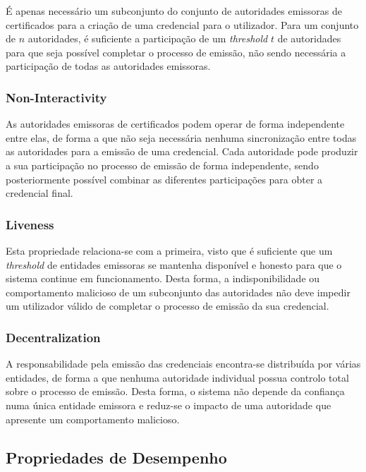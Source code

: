É apenas necessário um subconjunto do conjunto de autoridades emissoras de certificados para a criação de uma credencial para o utilizador. Para um conjunto de $n$ autoridades, é suficiente a participação de um \textit{threshold} $t$ de autoridades para que seja possível completar o processo de emissão, não sendo necessária a participação de todas as autoridades emissoras.

\subsubsection{Non-Interactivity}

As autoridades emissoras de certificados podem operar de forma independente entre elas, de forma a que não seja necessária nenhuma sincronização entre todas as autoridades para a emissão de uma credencial. Cada autoridade pode produzir a sua participação no processo de emissão de forma independente, sendo posteriormente possível combinar as diferentes participações para obter a credencial final.

\subsubsection{Liveness}

Esta propriedade relaciona-se com a primeira, visto que é suficiente que um \textit{threshold} de entidades emissoras se mantenha disponível e honesto para que o sistema continue em funcionamento. Desta forma, a indisponibilidade ou comportamento malicioso de um subconjunto das autoridades não deve impedir um utilizador válido de completar o processo de emissão da sua credencial.

\subsubsection{Decentralization}

A responsabilidade pela emissão das credenciais encontra-se distribuída por várias entidades, de forma a que nenhuma autoridade individual possua controlo total sobre o processo de emissão. Desta forma, o sistema não depende da confiança numa única entidade emissora e reduz-se o impacto de uma autoridade que apresente um comportamento malicioso.

\subsection{Propriedades de Desempenho}
\label{sub:dittor_propriedades_desempenho}


